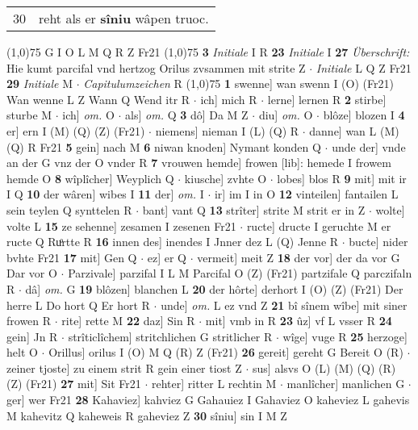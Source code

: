 \documentclass[8pt,a4paper,notitlepage]{article}
\begin{document}
\begin{table}[ht]
\begin{minipage}[t]{0.5\linewidth}
\begin{tabular}{rl}
30 & reht als er \textbf{sîniu} wâpen truoc.\\ 
\end{tabular}
\scriptsize
\line(1,0){75} \newline
G I O L M Q R Z Fr21 \newline
\line(1,0){75} \newline
\textbf{3} \textit{Initiale} I R  \textbf{23} \textit{Initiale} I  \textbf{27} \textit{Überschrift:} Hie kumt parcifal vnd hertzog Orilus zvsammen mit strite Z   $\cdot$ \textit{Initiale} L Q Z Fr21  \textbf{29} \textit{Initiale} M   $\cdot$ \textit{Capitulumzeichen} R  \newline
\line(1,0){75} \newline
\textbf{1} swenne] wan swenn I (O) (Fr21) Wan wenne L Z Wann Q Wend itr R  $\cdot$ ich] mich R  $\cdot$ lerne] lernen R \textbf{2} stirbe] sturbe M  $\cdot$ ich] \textit{om.} O  $\cdot$ als] \textit{om.} Q \textbf{3} dô] Da M Z  $\cdot$ diu] \textit{om.} O  $\cdot$ blôze] blozen I \textbf{4} er] ern I (M) (Q) (Z) (Fr21)  $\cdot$ niemens] nieman I (L) (Q) R  $\cdot$ danne] wan L (M) (Q) R Fr21 \textbf{5} gein] nach M \textbf{6} niwan knoden] Nymant konden Q  $\cdot$ unde der] vnde an der G vnz der O vnder R \textbf{7} vrouwen hemde] frowen [lib]: hemede I frowem hemde O \textbf{8} wîplîcher] Weyplich Q  $\cdot$ kiusche] zvhte O  $\cdot$ lobes] blos R \textbf{9} mit] mit ir I Q \textbf{10} der wâren] wibes I \textbf{11} der] \textit{om.} I  $\cdot$ ir] im I in O \textbf{12} vinteilen] fantailen L sein teylen Q synttelen R  $\cdot$ bant] vant Q \textbf{13} strîter] strite M strit er in Z  $\cdot$ wolte] volte L \textbf{15} ze sehenne] zesamen I zesenen Fr21  $\cdot$ ructe] dructe I geruchte M er ructe Q Ruͦrtte R \textbf{16} innen des] inendes I Jnner dez L (Q) Jenne R  $\cdot$ bucte] nider bvhte Fr21 \textbf{17} mit] Gen Q  $\cdot$ ez] er Q  $\cdot$ vermeit] meit Z \textbf{18} der vor] der da vor G Dar vor O  $\cdot$ Parzivale] parzifal I L M Parcifal O (Z) (Fr21) partzifale Q parczifaln R  $\cdot$ dâ] \textit{om.} G \textbf{19} blôzen] blanchen L \textbf{20} der hôrte] derhort I (O) (Z) (Fr21) Der herre L Do hort Q Er hort R  $\cdot$ unde] \textit{om.} L ez vnd Z \textbf{21} bî sînem wîbe] mit siner frowen R  $\cdot$ rite] rette M \textbf{22} daz] Sin R  $\cdot$ mit] vmb in R \textbf{23} ûz] vf L vsser R \textbf{24} gein] Jn R  $\cdot$ strîticlîchem] stritchlichen G stritlicher R  $\cdot$ wîge] vuge R \textbf{25} herzoge] helt O  $\cdot$ Orillus] orilus I (O) M Q (R) Z (Fr21) \textbf{26} gereit] gereht G Bereit O (R)  $\cdot$ zeiner tjoste] zu einem strit R gein einer tiost Z  $\cdot$ sus] alsvs O (L) (M) (Q) (R) (Z) (Fr21) \textbf{27} mit] Sit Fr21  $\cdot$ rehter] ritter L rechtin M  $\cdot$ manlîcher] manlichen G  $\cdot$ ger] wer Fr21 \textbf{28} Kahaviez] kahviez G Gahauiez I Gahaviez O kaheviez L gahevis M kahevitz Q kaheweis R gaheviez Z \textbf{30} sîniu] sin I M Z \newline

\end{minipage}
\end{table}
\end{document}
